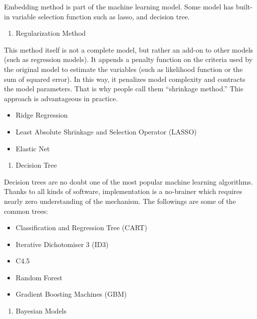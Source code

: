 \documentclass[12pt,]{krantz}
\providecommand{\tightlist}{%
  \setlength{\itemsep}{0pt}\setlength{\parskip}{0pt}}
\theoremstyle{definition}
\theoremstyle{definition}
\theoremstyle{definition}
\theoremstyle{remark}
\begin{document}
Embedding method is part of the machine learning model. Some model has
built-in variable selection function such as lasso, and decision tree.

\begin{enumerate}
\def\labelenumi{\arabic{enumi}.}
\setcounter{enumi}{3}
\tightlist
\item
  Regularization Method
\end{enumerate}

This method itself is not a complete model, but rather an add-on to
other models (such as regression models). It appends a penalty function
on the criteria used by the original model to estimate the variables
(such as likelihood function or the sum of squared error). In this way,
it penalizes model complexity and contracts the model parameters. That
is why people call them ``shrinkage method.'' This approach is
advantageous in practice.

\begin{itemize}
\tightlist
\item
  Ridge Regression
\item
  Least Absolute Shrinkage and Selection Operator (LASSO)
\item
  Elastic Net
\end{itemize}

\begin{enumerate}
\def\labelenumi{\arabic{enumi}.}
\setcounter{enumi}{4}
\tightlist
\item
  Decision Tree
\end{enumerate}

Decision trees are no doubt one of the most popular machine learning
algorithms. Thanks to all kinds of software, implementation is a
no-brainer which requires nearly zero understanding of the mechanism.
The followings are some of the common trees:

\begin{itemize}
\tightlist
\item
  Classification and Regression Tree (CART)
\item
  Iterative Dichotomiser 3 (ID3)
\item
  C4.5
\item
  Random Forest
\item
  Gradient Boosting Machines (GBM)
\end{itemize}

\begin{enumerate}
\def\labelenumi{\arabic{enumi}.}
\setcounter{enumi}{5}
\tightlist
\item
  Bayesian Models
\end{enumerate}
\end{document}
